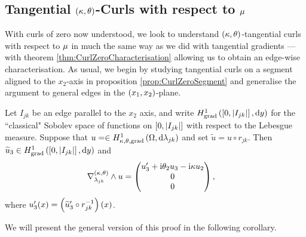 \subsection{Tangential $\left( \kappa, \theta \right)$-Curls with respect to $\mu$} \label{apps:TangentialCurls}
With curls of zero now understood, we look to understand $\left( \kappa, \theta \right)$-tangential curls with respect to $\mu$ in much the same way as we did with tangential gradients --- with theorem \ref{thm:CurlZeroCharacterisation} allowing us to obtain an edge-wise characterisation.
As usual, we begin by studying tangential curls on a segment aligned to the $x_2$-axis in proposition \ref{prop:CurlZeroSegment} and generalise the argument to general edges in the $\left( x_1,x_2 \right)$-plane.

\begin{prop} \label{prop:TangCurlsSegment}
	Let $I_{jk}$ be an edge parallel to the $x_2$ axis, and write $H^1_\mathrm{grad}\left( \left[ 0,\left\lvert I_{jk} \right\rvert \right], \mathrm{d}y \right)$ for the ``classical" Sobolev space of functions on $\left[ 0,\left\lvert I_{jk} \right\rvert \right]$ with respect to the Lebesgue measure.
	Suppose that $u=\in H^1_{\kappa,\theta,\mathrm{grad}}\left( \Omega, \mathrm{d}\lambda_{jk} \right)$ and set $\widetilde{u} = u \circ r_{jk}$.
	Then $\widetilde{u}_3\in H^1_\mathrm{grad}\left( \left[ 0,\left\lvert I_{jk} \right\rvert \right], \mathrm{d}y \right)$ and
	\begin{align*}
		\nabla_{\lambda_{jk}}^{\left( \kappa, \theta \right)}\wedge u &= 
		\begin{pmatrix} u_3' + \mathrm{i}\theta_2 u_3 - \mathrm{i}\kappa u_2 \\ 0 \\ 0 \end{pmatrix},
	\end{align*}
	where $u_3'(x) = \left( \widetilde{u}'_3\circ r_{jk}^{-1} \right)(x)$.
\end{prop}
We will present the general version of this proof in the following corollary.
